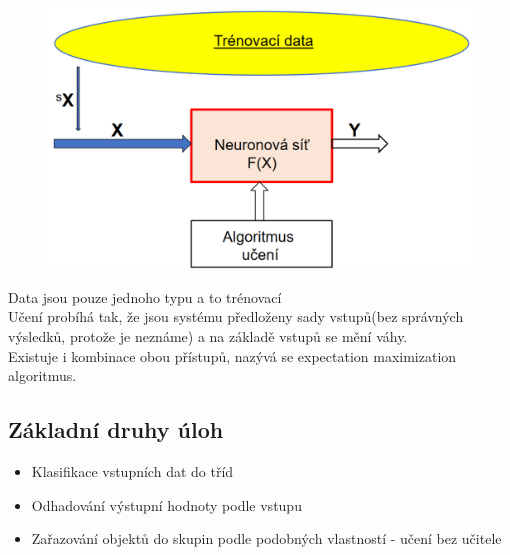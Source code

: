 \begin{figure}[H]
    \includegraphics[scale = 0.4]{images/bezUcitele.png}
\end{figure}
Data jsou pouze jednoho typu a to trénovací\\
Učení probíhá tak, že jsou systému předloženy sady vstupů(bez správných výsledků, protože je neznáme) a na základě vstupů se mění váhy.\\

Existuje i kombinace obou přístupů, nazývá se expectation maximization algoritmus.

\subsection*{Základní druhy úloh}
\begin{itemize}
    \item Klasifikace vstupních dat do tříd
    \item Odhadování výstupní hodnoty podle vstupu
    \item Zařazování objektů do skupin podle podobných vlastností - učení bez učitele
\end{itemize}